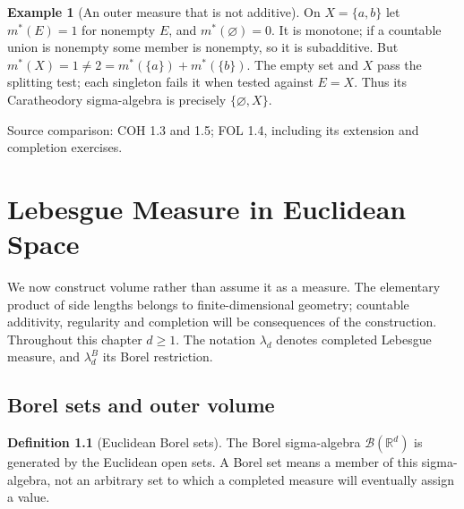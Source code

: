 \documentclass[11pt,oneside,openany]{book}
\theoremstyle{definition}
\newtheorem{definition}[theorem]{Definition}
\newtheorem{example}[theorem]{Example}
\theoremstyle{remark}
\newcommand{\R}{\mathbb R}\newcommand{\C}{\mathbb C}
\newcommand{\BB}{\mathcal B}\newcommand{\SSS}{\mathcal S}
\newcommand{\family}[1]{}
\newcommand{\source}[1]{\par\begingroup\small\sffamily\color{black!65}Source comparison: #1\par\endgroup}
\begin{document}
\begin{example}[An outer measure that is not additive]
\family{D11.02.outer_not_additive}\label{d11:02:outer-not-additive}
On $X=\{a,b\}$ let $m^*(E)=1$ for nonempty $E$, and $m^*(\varnothing)=0$.
It is monotone; if a countable union is nonempty some member is nonempty,
so it is subadditive. But $m^*(X)=1\ne2=m^*(\{a\})+m^*(\{b\})$.
The empty set and $X$ pass the splitting test; each singleton fails it when
tested against $E=X$. Thus its Caratheodory sigma-algebra is precisely
$\{\varnothing,X\}$.
\end{example}
\source{COH 1.3 and 1.5; FOL 1.4, including its extension and completion exercises.}



\chapter{Lebesgue Measure in Euclidean Space}\label{ch:d11-03}

We now construct volume rather than assume it as a measure. The elementary
product of side lengths belongs to finite-dimensional geometry; countable
additivity, regularity and completion will be consequences of the construction.
Throughout this chapter $d\geq1$. The notation $\lambda_d$ denotes completed
Lebesgue measure, and $\lambda_d^B$ its Borel restriction.

\section{Borel sets and outer volume}

\begin{definition}[Euclidean Borel sets]
\family{D11.03.borel_euclidean}\label{d11:03:borel-euclidean}
The Borel sigma-algebra $\BB(\R^d)$ is generated by the Euclidean open sets.
A Borel set means a member of this sigma-algebra, not an arbitrary set to
which a completed measure will eventually assign a value.
\end{definition}
\end{document}
